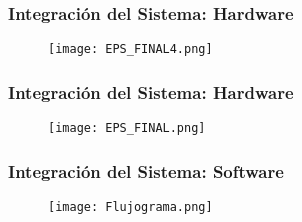 
\begin{frame}
    \frametitle{Integración del Sistema: Hardware}
    \begin{figure}[H]
        \centering
        \texttt{[image: EPS\_FINAL4.png]} %
        \label{fig:PCB1Final}
    \end{figure}
\end{frame}


\begin{frame}
    \frametitle{Integración del Sistema: Hardware}

    \begin{figure}[H]
        \centering
        \texttt{[image: EPS\_FINAL.png]}
        \label{fig:PCB2Final}
    \end{figure}
\end{frame}



\begin{frame}
    \frametitle{Integración del Sistema: Software}

    \begin{figure}[H]
        \centering
        \texttt{[image: Flujograma.png]} %
        \label{fig:Flujograma}
    \end{figure}
\end{frame}

